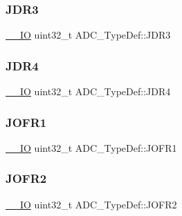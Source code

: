 \mbox{\label{struct_a_d_c___type_def_a40999cd0a255ef62b2340e2726695063}} 
\subsubsection{\texorpdfstring{JDR3}{JDR3}}
{\footnotesize\ttfamily \mbox{\hyperlink{group___c_m_s_i_s___c_m3__core__definitions_gaec43007d9998a0a0e01faede4133d6be}{\+\_\+\+\_\+\+IO}} uint32\+\_\+t A\+D\+C\+\_\+\+Type\+Def\+::\+J\+D\+R3}

\mbox{\label{struct_a_d_c___type_def_abae6e9d688b16ef350878998f5e21c0b}} 
\subsubsection{\texorpdfstring{JDR4}{JDR4}}
{\footnotesize\ttfamily \mbox{\hyperlink{group___c_m_s_i_s___c_m3__core__definitions_gaec43007d9998a0a0e01faede4133d6be}{\+\_\+\+\_\+\+IO}} uint32\+\_\+t A\+D\+C\+\_\+\+Type\+Def\+::\+J\+D\+R4}

\mbox{\label{struct_a_d_c___type_def_aa005e656f528aaad28d70d61c9db9b81}} 
\subsubsection{\texorpdfstring{JOFR1}{JOFR1}}
{\footnotesize\ttfamily \mbox{\hyperlink{group___c_m_s_i_s___c_m3__core__definitions_gaec43007d9998a0a0e01faede4133d6be}{\+\_\+\+\_\+\+IO}} uint32\+\_\+t A\+D\+C\+\_\+\+Type\+Def\+::\+J\+O\+F\+R1}

\mbox{\label{struct_a_d_c___type_def_aa20f76044c11042dde41c1060853fb82}} 
\subsubsection{\texorpdfstring{JOFR2}{JOFR2}}
{\footnotesize\ttfamily \mbox{\hyperlink{group___c_m_s_i_s___c_m3__core__definitions_gaec43007d9998a0a0e01faede4133d6be}{\+\_\+\+\_\+\+IO}} uint32\+\_\+t A\+D\+C\+\_\+\+Type\+Def\+::\+J\+O\+F\+R2}

